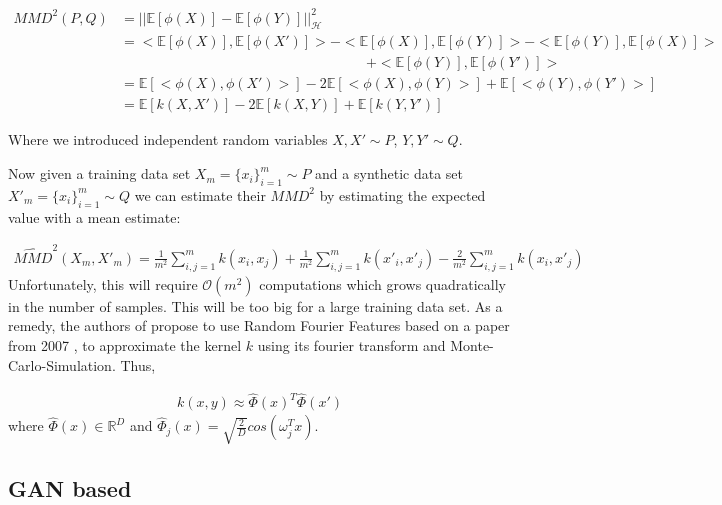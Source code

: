 \begin{align}
    MMD^2(P,Q) &= || \mathbb{E}[\phi(X)] - \mathbb{E}[\phi(Y)] ||^2_\mathcal{H} \nonumber \\
    &= <\mathbb{E}[\phi(X)], \mathbb{E}[\phi(X')]> - <\mathbb{E}[\phi(X)], \mathbb{E}[\phi(Y)]> - <\mathbb{E}[\phi(Y)], \mathbb{E}[\phi(X)]> \nonumber \\ &\phantom{mmmmmmmmmmmmmmmmmmmm}+ <\mathbb{E}[\phi(Y)], \mathbb{E}[\phi(Y')]> \nonumber \\
    &= \mathbb{E}[<\phi(X), \phi(X')>] - 2 \mathbb{E}[<\phi(X), \phi(Y)>] + \mathbb{E}[<\phi(Y), \phi(Y')>] \nonumber \\
    &= \mathbb{E}[k(X,X')] - 2 \mathbb{E}[k(X,Y)] + \mathbb{E}[k(Y,Y')]
\end{align}

Where we introduced independent random variables $X,X' \sim P$, $Y,Y' \sim Q$.

Now given a training data set $X_m = \{x_i\}_{i=1}^m \sim P$ and a synthetic data set $X'_m = \{x_i\}_{i=1}^m \sim Q$ we can estimate their $MMD^2$ by estimating the expected value with a mean estimate:

\begin{align}
    \widehat{MMD}^2(X_m, X'_m) = \frac{1}{m^2} \sum_{i,j=1}^m k(x_i,x_j) + \frac{1}{m^2} \sum_{i,j=1}^m k(x'_i,x'_j) - \frac{2}{m^2} \sum_{i,j=1}^m k(x_i,x'_j)
\end{align}
Unfortunately, this will require $\mathcal{O}(m^2)$ computations which grows quadratically in the number of samples. This will be too big for a large training data set. As a remedy, the authors of \parencite{dpmerf} propose to use Random Fourier Features based on a paper from 2007 \parencite[see][]{rff}, to approximate the kernel $k$ using its fourier transform and Monte-Carlo-Simulation. Thus,

\begin{align}
    k(x,y) \approx \hat{\Phi}(x)^T \hat{\Phi}(x')
\end{align}
where $\hat{\Phi}(x) \in \mathbb{R}^D$ and $\hat{\Phi}_j(x) = \sqrt{\frac{2}{D}} cos (\omega_j^T x)$.

\subsection{GAN based} 